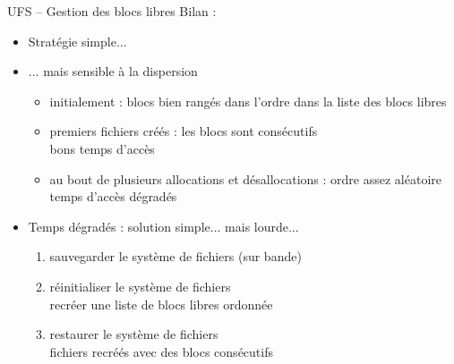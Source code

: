 \begin {frame} {UFS -- Gestion des blocs libres}
    Bilan :

    \begin {itemize}
	\item Stratégie simple...
	\item ... mais sensible à la dispersion
	    \begin {itemize}
		\item initialement : blocs bien rangés dans
		    l'ordre dans la liste des blocs libres
		\item premiers fichiers créés : les blocs sont consécutifs
		    \\
		    \implique bons temps d'accès
		\item au bout de plusieurs allocations et
		    désallocations : ordre assez aléatoire
		    \\
		    \implique temps d'accès dégradés
	    \end {itemize}
	\item Temps dégradés : solution simple... mais lourde...
	    \begin {enumerate}
		\item sauvegarder le système de fichiers (sur bande)
		\item réinitialiser le système de fichiers \\
		    \implique recréer une liste de blocs libres ordonnée
		\item restaurer le système de fichiers \\
		    \implique fichiers recréés avec des blocs
			consécutifs
	    \end {enumerate}
    \end {itemize}
\end {frame}

